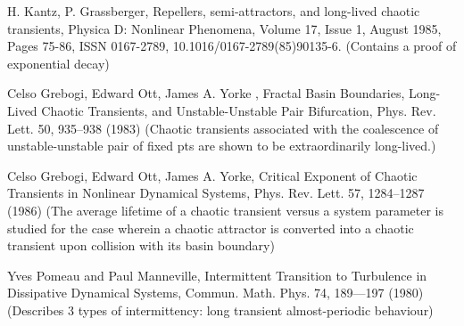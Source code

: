 \documentclass[xcolor=x11names,compress]{beamer}
\renewcommand{\(}{\begin{columns}}
\renewcommand{\)}{\end{columns}}
\newcommand{\<}[1]{\begin{column}{#1}}
\renewcommand{\>}{\end{column}}
\begin{document}
\begin{frame}

\begin{footnotesize}

\begin{thebibliography}{20}
\bibitem{} H.   Kantz, P.   Grassberger, Repellers, semi-attractors, and 
long-lived chaotic transients, Physica D: Nonlinear Phenomena, Volume 17, 
Issue 1, August 1985, Pages 75-86, ISSN 0167-2789, 10.1016/0167-2789(85)90135-6.
(Contains a proof of exponential decay)

 Celso Grebogi, Edward Ott, James A.   Yorke , Fractal Basin 
Boundaries, Long-Lived Chaotic Transients, and Unstable-Unstable Pair 
Bifurcation, Phys.   Rev.   Lett.   50, 935–938 (1983)
(Chaotic transients associated with the coalescence of unstable-unstable pair 
of fixed pts are shown to be extraordinarily long-lived.)

\bibitem{} Celso Grebogi, Edward Ott, James A.   Yorke, Critical Exponent of 
Chaotic Transients in Nonlinear Dynamical Systems, Phys.   Rev.   Lett.   57, 
1284–1287 (1986)
(The average lifetime of a chaotic transient versus a system parameter is 
studied for the case wherein a chaotic attractor is converted into a chaotic 
transient upon collision with its basin boundary)


\bibitem{} Yves Pomeau and Paul Manneville, Intermittent Transition to Turbulence
in Dissipative Dynamical Systems, Commun.   Math.   Phys.   74, 189---197 (1980)
(Describes 3 types of intermittency: long transient almost-periodic behaviour)
\end{thebibliography}

\end{footnotesize}
\end{frame}
\end{document}
